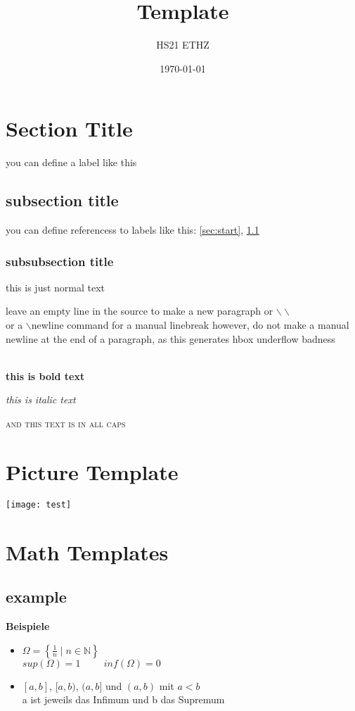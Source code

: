 \documentclass[a4paper,10pt,landscape]{scrartcl}
\title{Template}
\subtitle{HS21 ETHZ}
\author{}
\date{\today}
\begin{document}
\begin{multicols*}{3}
%
\maketitle
%
\section{Section Title}
you can define a label like this \label{sec:start}
\subsection{subsection title} \label{sec:second}
you can define referencess to labels like this: \ref{sec:start}, \ref{sec:second}
\subsubsection{subsubsection title}
this is just normal text

leave an empty line in the source to make a new paragraph
or $\backslash\backslash$ \\
or a $\backslash$newline command for a manual linebreak\newline
however, do not make a manual newline at the end of a paragraph, as this generates hbox underflow badness \\

\\

\textbf{this is bold text}

\textit{this is italic text}

\textsc{and this text is in all caps}

\vfill\null %
\columnbreak
%
\section{Picture Template}
\texttt{[image: test]}
%
\section{Math Templates}
\subsection{example}
\begin{example}
    \textbf{Beispiele}
	\begin{itemize}
		\item $\Omega = \left\{\frac{1}{n}\mid n\in \mathbb{N}\right\}$\\[3pt]
		$sup(\Omega) = 1 \hspace{1cm} inf(\Omega) = 0$
		\item$[a, b]$, $[a, b)$, $(a, b]$ und $(a, b)$ mit $a<b$\\
	    a ist jeweils das Infimum und b das Supremum
	\end{itemize}
\end{example}
%

\end{multicols*}
\end{document}
